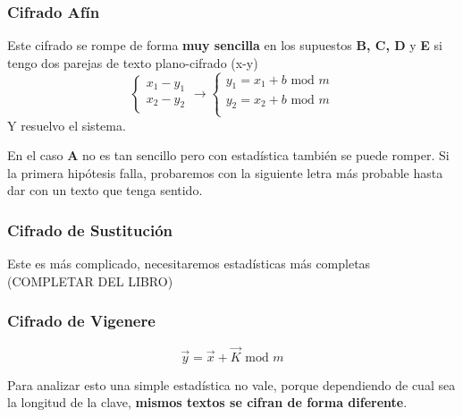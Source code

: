 \subsubsection{Cifrado Afín}

Este cifrado se rompe de forma \textbf{muy sencilla} en los supuestos \textbf{B, C, D} y \textbf{E} si tengo dos parejas de texto plano-cifrado (x-y)
$$\begin{cases}
x_1 - y_1\\
x_2 - y_2
\end{cases} \rightarrow \begin{cases}
y_1 = x_1 + b \text{ mod }m\\
y_2 = x_2 + b \text{ mod }m\\
\end{cases}$$
Y resuelvo el sistema.

En el caso \textbf{A} no es tan sencillo pero con estadística también se puede romper. Si la primera hipótesis falla, probaremos con la siguiente letra más probable hasta dar con un texto que tenga sentido.

\subsubsection{Cifrado de Sustitución}

Este es más complicado, necesitaremos estadísticas más completas (COMPLETAR DEL LIBRO)

\subsubsection{Cifrado de Vigenere}

$$\overrightarrow{y} = \overrightarrow{x} + \overrightarrow{K} \text{ mod } m$$

Para analizar esto una simple estadística no vale, porque dependiendo de cual sea  la longitud de la clave, \textbf{mismos textos se cifran de forma diferente}.

